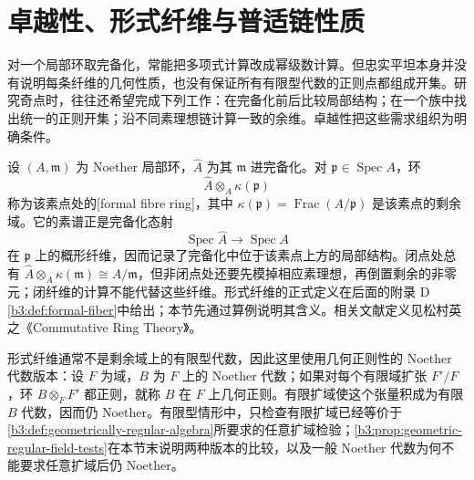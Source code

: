 
\section{卓越性、形式纤维与普适链性质}
\label{b3:sec:C01}

%
%
%



对一个局部环取完备化，常能把多项式计算改成幂级数计算。但忠实平坦本身并没有说明每条纤维的几何性质，也没有保证所有有限型代数的正则点都组成开集。研究奇点时，往往还希望完成下列工作：在完备化前后比较局部结构；在一个族中找出统一的正则开集；沿不同素理想链计算一致的余维。卓越性把这些需求组织为明确条件。

\ProseParagraphBreak
设 \((A,\mathfrak m)\) 为 Noether 局部环，\(\widehat A\) 为其 \(\mathfrak m\) 进完备化。对 \(\mathfrak p\in\operatorname{Spec}A\)，环
\[
	\widehat A\otimes_A\kappa(\mathfrak p)
\]
称为该素点处的[formal fibre ring]，其中 \(\kappa(\mathfrak p)=\operatorname{Frac}(A/\mathfrak p)\) 是该素点的剩余域。它的素谱正是完备化态射
\[
	\operatorname{Spec}\widehat A\longrightarrow\operatorname{Spec}A
\]
在 \(\mathfrak p\) 上的概形纤维，因而记录了完备化中位于该素点上方的局部结构。闭点处总有 \(\widehat A\otimes_A\kappa(\mathfrak m)\cong A/\mathfrak m\)，但非闭点处还要先模掉相应素理想，再倒置剩余的非零元；闭纤维的计算不能代替这些纤维。形式纤维的正式定义在后面的附录 D \cref{b3:def:formal-fiber}中给出；本节先通过算例说明其含义。相关文献定义见松村英之《Commutative Ring Theory》\cite[\S 32, pp. 255--256]{Matsumura1989CommutativeRingTheory}。

形式纤维通常不是剩余域上的有限型代数，因此这里使用几何正则性的 Noether 代数版本：设 \(F\) 为域，\(B\) 为 \(F\) 上的 Noether 代数；如果对每个有限域扩张 \(F'/F\)，环 \(B\otimes_FF'\) 都正则，就称 \(B\) 在 \(F\) 上几何正则。有限扩域使这个张量积成为有限 \(B\) 代数，因而仍 Noether。有限型情形中，只检查有限扩域已经等价于\cref{b3:def:geometrically-regular-algebra}所要求的任意扩域检验；\cref{b3:prop:geometric-regular-field-tests}在本节末说明两种版本的比较，以及一般 Noether 代数为何不能要求任意扩域后仍 Noether。

